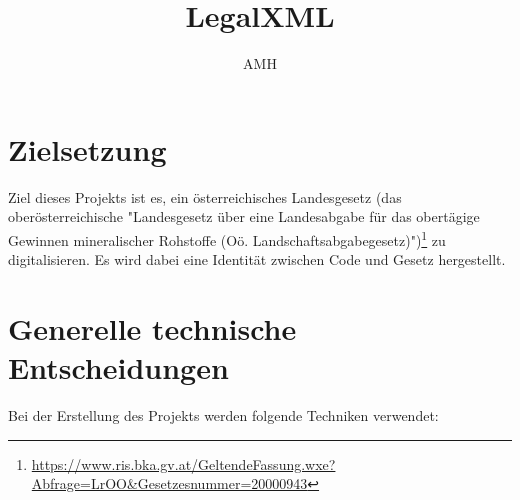 \documentclass[8pt]{article}
\title{LegalXML}
\author{AMH}
\begin{document}
\maketitle
\tableofcontents
\newpage

\section{Zielsetzung}
Ziel dieses Projekts ist es, ein österreichisches Landesgesetz (das oberösterreichische "Landesgesetz über eine Landesabgabe für das obertägige Gewinnen mineralischer Rohstoffe
(Oö. Landschaftsabgabegesetz)")\footnote{\url{https://www.ris.bka.gv.at/GeltendeFassung.wxe?Abfrage=LrOO&Gesetzesnummer=20000943}}
zu digitalisieren. Es wird dabei eine Identität zwischen Code und Gesetz hergestellt.

\section{Generelle technische Entscheidungen}
Bei der Erstellung des Projekts werden folgende Techniken verwendet:
\end{document}
